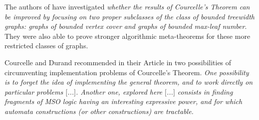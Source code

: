\documentclass[a4paper, 12pt, bibliography=totoc]{scrartcl}
\begin{document}
The authors of \cite{MetatheoremsforRestrictionsofTreewidth} have investigated \textit{whether the results of Courcelle's Theorem can be improved by focusing on two proper subclasses of the class of bounded treewidth graphs: graphs of bounded vertex cover and graphs of bounded max-leaf number}. They were also able to prove stronger algorithmic meta-theorems for these more restricted classes of graphs. 

Courcelle and Durand recommended in their Article in \cite{FiniteAutomata10} two possibilities of circumventing implementation problems of Courcelle's Theorem. \textit{One possibility is to forget the idea of implementing the general theorem, and to work directly on particular problems $[$...$]$. Another one, explored here $[$...$]$ consists in finding fragments of MSO logic having an interesting expressive power, and for which automata constructions (or other constructions) are tractable.}
%

%
\newpage
\end{document}
